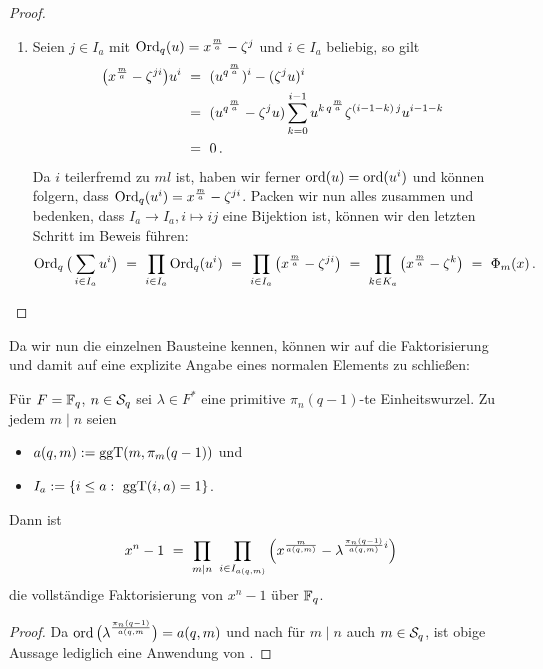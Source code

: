 \begin{proof}
\begin{enumerate}
  \item Seien $j\in I_a$ mit $\Ord_q(u) = x^\frac m a - \zeta^j$ und 
    $i\in I_a$ beliebig, so gilt
    \begin{align*}
      \big( x^\frac m a - \zeta^{ji} \big) u^i \speq{&=}
      (u^{q^\frac m a})^i - (\zeta^ju)^i \\
      \speq{&=} (u^{q^\frac m a} - \zeta^ju) 
        \sum_{k=0}^{i-1} u^{k\,q^\frac m a} \zeta^{(i-1-k)\,j}u^{i-1-k} \\
        \speq{&=} 0\,.
    \end{align*}
    Da $i$ teilerfremd zu $ml$ ist, haben wir ferner $\ord(u) = \ord(u^i)$ und
    können folgern, dass $\Ord_q(u^i) = x^\frac m a - \zeta^{ji}$.
    Packen wir nun alles zusammen und bedenken, dass
    $I_a \to I_a, i\mapsto ij$ eine Bijektion ist, können wir den letzten
    Schritt im Beweis führen:
    \[ \Ord_q\big( \sum_{i\in I_a} u^i \big)
      \speq= \prod_{i\in I_a} \Ord_q(u^i) \speq=
      \prod_{i \in I_a} \big( x^\frac m a - \zeta^{ji} \big)
      \speq= \prod_{k\in K_a} \big(x^\frac m a - \zeta^k \big)
      \speq= \Phi_m(x)\,.\]
  \end{enumerate}
\end{proof}

Da wir nun die einzelnen Bausteine kennen, können wir auf die Faktorisierung
und damit auf eine explizite Angabe eines normalen Elements zu schließen:

\begin{kor}
  \label{kor:konstruktion-q-ordnung}
  Für $F = \F_q$, $n\in \S_q$ sei $\lambda \in F^\ast$ eine primitive 
  $\pi_n(q-1)$-te Einheitswurzel. Zu jedem $m \mid n$ seien
  \begin{itemize}
    \item $a(q,m) := \ggT(m,\pi_m(q-1))$ und
    \item $I_a := \{ i\leq a:\ \ggT(i,a) = 1\}$.
  \end{itemize}
  Dann ist
  \[ x^n-1 \speq= \prod_{m\mid n}\ \prod_{i\in I_{a(q,m)}} 
    \left( x^\frac{m}{a(q,m)} - \lambda^{\frac{\pi_n(q-1)}{a(q,m)} i}\right)\]
  die vollständige Faktorisierung von $x^n-1$ über $\F_q$.
\end{kor}
\begin{proof}
  Da  $\ord\big(\lambda^{\frac{\pi_n(q-1)}{a(q,m}}\big) = a(q,m)$
  und nach \TODO für $m\mid n$ auch $m\in \S_q$, ist obige Aussage lediglich
  eine Anwendung von .
\end{proof}

